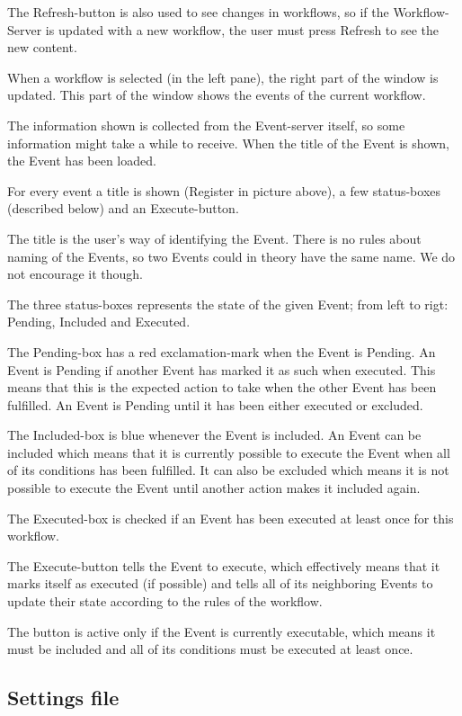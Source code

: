 The Refresh-button is also used to see changes in workflows, so if the
Workflow-Server is updated with a new workflow, the user must press
Refresh to see the new content.

When a workflow is selected (in the left pane), the right part of the
window is updated. This part of the window shows the events of the
current workflow.

The information shown is collected from the Event-server itself, so some
information might take a while to receive. When the title of the Event
is shown, the Event has been loaded.

For every event a title is shown (Register in picture above), a few
status-boxes (described below) and an Execute-button.

The title is the user's way of identifying the Event. There is no rules
about naming of the Events, so two Events could in theory have the same
name. We do not encourage it though.

The three status-boxes represents the state of the given Event; from
left to rigt: Pending, Included and Executed.

The Pending-box has a red exclamation-mark when the Event is Pending. An
Event is Pending if another Event has marked it as such when executed.
This means that this is the expected action to take when the other Event
has been fulfilled. An Event is Pending until it has been either
executed or excluded.

The Included-box is blue whenever the Event is included. An Event can be
included which means that it is currently possible to execute the Event
when all of its conditions has been fulfilled. It can also be excluded
which means it is not possible to execute the Event until another action
makes it included again.

The Executed-box is checked if an Event has been executed at least once
for this workflow.

The Execute-button tells the Event to execute, which effectively means
that it marks itself as executed (if possible) and tells all of its
neighboring Events to update their state according to the rules of the
workflow.

The button is active only if the Event is currently executable, which
means it must be included and all of its conditions must be executed at
least once.

\subsection{Settings file}\label{settings-file}

